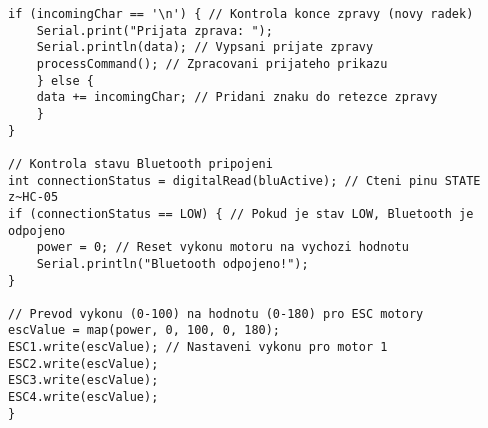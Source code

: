 \documentclass[12pt]{report}
\begin{document}
\begin{appendices}
\begin{lstlisting}[title={}, caption={}, label={}, basicstyle=\footnotesize\ttfamily, inputencoding=utf8]
	if (incomingChar == '\n') { // Kontrola konce zpravy (novy radek)
	Serial.print("Prijata zprava: ");
	Serial.println(data); // Vypsani prijate zpravy
	processCommand(); // Zpracovani prijateho prikazu
	} else {
	data += incomingChar; // Pridani znaku do retezce zpravy
	}
}

// Kontrola stavu Bluetooth pripojeni
int connectionStatus = digitalRead(bluActive); // Cteni pinu STATE z~HC-05
if (connectionStatus == LOW) { // Pokud je stav LOW, Bluetooth je odpojeno
	power = 0; // Reset vykonu motoru na vychozi hodnotu
	Serial.println("Bluetooth odpojeno!");
}

// Prevod vykonu (0-100) na hodnotu (0-180) pro ESC motory
escValue = map(power, 0, 100, 0, 180); 
ESC1.write(escValue); // Nastaveni vykonu pro motor 1
ESC2.write(escValue);
ESC3.write(escValue);
ESC4.write(escValue);
}	
\end{lstlisting}  
\end{appendices}
\end{document}
